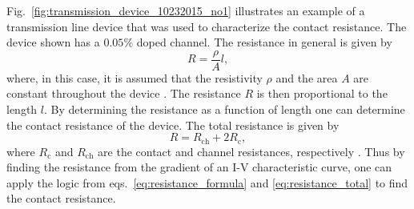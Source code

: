 \noindent Fig.~\ref{fig:transmission_device_10232015_no1} illustrates an example of a transmission line device that was used to characterize the contact resistance. The device shown has a $0.05\%$  doped  channel. The resistance in general is given by
\begin{equation}\label{eq:resistance_formula}
	R = \frac{\rho}{A} l,
\end{equation}
where, in this case, it is assumed that the resistivity $\rho$ and the area $A$ are constant throughout the device \cite{Schroder_Semiconductor2006}. The resistance $R$ is then proportional to the length $l$. By determining the resistance as a function of length one can determine the contact resistance of the device. The total resistance is given by
\begin{equation}\label{eq:resistance_total}
	R = R_\mathrm{ch} + 2R_\mathrm{c},
\end{equation}
where $R_\mathrm{c}$ and $R_\mathrm{ch}$ are the contact and channel resistances, respectively \cite{Schroder_Semiconductor2006}. Thus by finding the resistance from the gradient of an I-V characteristic curve, one can apply the logic from eqs.~\ref{eq:resistance_formula} and \ref{eq:resistance_total} to find the contact resistance.

